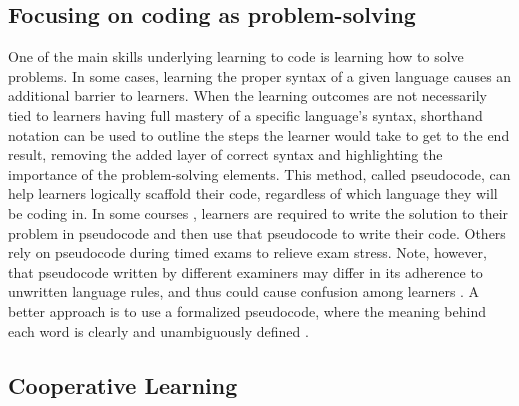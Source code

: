 \subsection{Focusing on coding as problem-solving}
One of the main skills underlying learning to code is learning how to solve problems. 
In some cases, learning the proper syntax of a given language causes an additional barrier to learners.
When the learning outcomes are not necessarily tied to learners having full mastery of a specific language's syntax, shorthand notation can be used to outline the steps the learner would take to get to the end result, removing the added layer of correct syntax and highlighting the importance of the problem-solving elements.
This method, called pseudocode, can help learners logically scaffold their code, regardless of which language they will be coding in.
In some courses \citep[e.g.,][]{olsen_using_2005}, learners are required to write the solution to their problem in pseudocode and then use that pseudocode to write their code.
Others rely on pseudocode during timed exams to relieve exam stress.
Note, however, that pseudocode written by different examiners may differ in its adherence to unwritten language rules, and thus could cause confusion among learners \citep{cutts_code_2014}. A better approach is to use a formalized pseudocode, where the meaning behind each word is clearly and unambiguously defined \citep{cutts_code_2014}.


\subsection{Cooperative Learning} 


